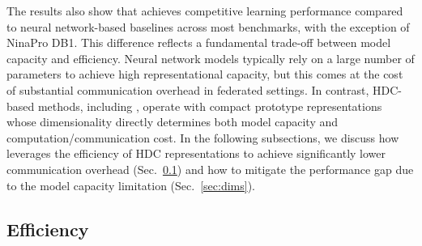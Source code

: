 \documentclass[lettersize,journal]{IEEEtran}
\newcommand{\rev}[1]{#1}
\begin{document}
The results also show that \Design achieves competitive learning performance compared to neural network-based baselines across most benchmarks, with the exception of NinaPro DB1.
This difference reflects a fundamental trade-off between model capacity and efficiency.
Neural network models typically rely on a large number of parameters to achieve high representational capacity, but this comes at the cost of substantial communication overhead in federated settings.
In contrast, HDC-based methods, including \Design, operate with compact prototype representations whose dimensionality directly determines both model capacity and computation/communication cost.
In the following subsections, we discuss how \Design leverages the efficiency of HDC representations to achieve significantly lower communication overhead (Sec.~\ref{sec:eff}) and how to mitigate the performance gap due to the model capacity limitation (Sec.~\ref{sec:dims}).






\subsection{Efficiency}
\label{sec:eff}

\begin{table}[t]
\centering
\caption{Bootstrap cost breakdown of \Design for shared-basis and \rev{local-state} initialization.}
\label{tab:bootstrap_breakdown_ours_dummy_v4}
\end{table}
\end{document}
